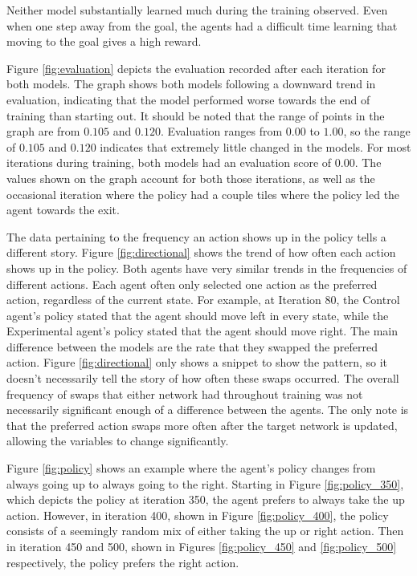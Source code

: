 \documentclass[12pt,letterpaper]{article}
\begin{document}
Neither model substantially learned much during the training observed.
Even when one step away from the goal, the agents had a difficult time learning that moving to the goal gives a high reward.

Figure \ref{fig:evaluation} depicts the evaluation recorded after each iteration for both models.
The graph shows both models following a downward trend in evaluation, indicating that the model performed worse towards the end of training than starting out.
It should be noted that the range of points in the graph are from $0.105$ and $0.120$.
Evaluation ranges from $0.00$ to $1.00$, so the range of $0.105$ and $0.120$ indicates that extremely little changed in the models.
For most iterations during training, both models had an evaluation score of $0.00$.
The values shown on the graph account for both those iterations, as well as the occasional iteration where the policy had a couple tiles where the policy led the agent towards the exit.

The data pertaining to the frequency an action shows up in the policy tells a different story.
Figure \ref{fig:directional} shows the trend of how often each action shows up in the policy.
Both agents have very similar trends in the frequencies of different actions.
Each agent often only selected one action as the preferred action, regardless of the current state.
For example, at Iteration 80, the Control agent's policy stated that the agent should move left in every state, while the Experimental agent's policy stated that the agent should move right.
The main difference between the models are the rate that they swapped the preferred action.
Figure \ref{fig:directional} only shows a snippet to show the pattern, so it doesn't necessarily tell the story of how often these swaps occurred.
The overall frequency of swaps that either network had throughout training was not necessarily significant enough of a difference between the agents.
The only note is that the preferred action swaps more often after the target network is updated, allowing the variables to change significantly.

Figure \ref{fig:policy} shows an example where the agent's policy changes from always going up to always going to the right.
Starting in Figure \ref{fig:policy_350}, which depicts the policy at iteration 350, the agent prefers to always take the up action.
However, in iteration 400, shown in Figure \ref{fig:policy_400}, the policy consists of a seemingly random mix of either taking the up or right action.
Then in iteration 450 and 500, shown in Figures \ref{fig:policy_450} and \ref{fig:policy_500} respectively, the policy prefers the right action.
\end{document}
